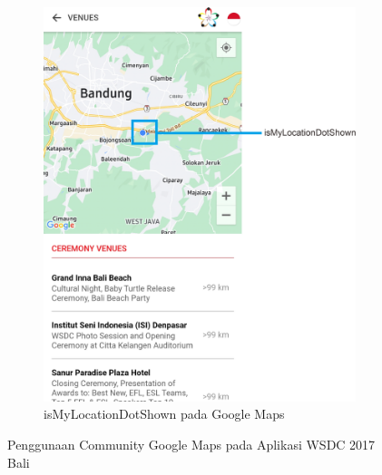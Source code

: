 \begin{itemize}
\begin{figure}[H]
\begin{subfigure}[b]{0.45\textwidth}
         \includegraphics[width=\textwidth]{Gambar/VenueMapPageOption2.png}
         \caption{isMyLocationDotShown pada Google Maps}
         \label{fig:VenueMapPageOption2}
     \end{subfigure}
        \caption{Penggunaan Community Google Maps pada Aplikasi WSDC 2017 Bali}
        \label{fig:VenuesMapPenggunaan2}
\end{figure}
		

\end{itemize}
